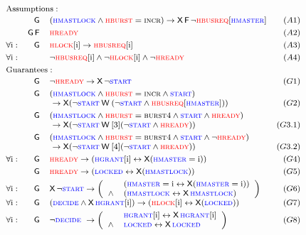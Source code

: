 \[
{\footnotesize
\begin{array}{rrlr}
\multicolumn{3}{l}{\mathrm{Assumptions:}} \\[2pt]
& \always & (\hmastlock \land \hburst = \hincr) \rightarrow \nextt \eventually \neg \hbusreqi[\hmaster] & (A1)\\[3pt]
& \always \eventually & \hready & (A2) \\[3pt]
\forall \mathrm i: & \always & \hlocki \rightarrow \hbusreqi & (A3) \\[3pt]
\forall \mathrm i: & & \neg \hbusreqi \land \neg \hlocki \land \neg \hready & (A4) \\[3pt]
\multicolumn{3}{l}{\mathrm{Guarantees:}} \\[2pt]
& \always & \neg \hready \rightarrow \nextt \neg \hstart & (G1) \\[3pt]
& \always & (\hmastlock \land \hburst = \hincr \land \hstart)\\
& & ~\rightarrow \nextt (\neg \hstart \weakuntil (\neg \hstart \land \hbusreqi[\hmaster])) & (G2) \\[3pt]
& \always & (\hmastlock \land \hburst = \hburstfour \land \hstart \land \hready)\\
& & ~\rightarrow \nextt (\neg \hstart \weakuntil[3] (\neg \hstart \land \hready)) & (G3.1) \\[3pt]
& \always & (\hmastlock \land \hburst = \hburstfour \land \hstart \land \neg \hready)\\
& & ~\rightarrow \nextt (\neg \hstart \weakuntil[4] (\neg \hstart \land \hready)) & (G3.2) \\[3pt]
\forall \mathrm i: & \always & \hready \rightarrow (\hgranti \leftrightarrow \nextt (\hmaster = {\mathrm i})) & (G4)\\[3pt]
& \always & \hready \rightarrow (\hlocked \leftrightarrow \nextt (\hmastlock)) & (G5)\\[3pt]
\forall \mathrm i: & \always & \nextt \neg \hstart \impl \left(
\begin{array}{ll}
 & (\hmaster = {\mathrm i} \leftrightarrow \nextt (\hmaster = {\mathrm i}))\\
\land & (\hmastlock \leftrightarrow \nextt \hmastlock)
\end{array}
 \right) & (G6)\\[3pt]
\forall \mathrm i: & \always & (\hdecide \land \nextt \hgranti) \rightarrow (\hlocki \leftrightarrow \nextt (\hlocked)) & (G7)\\[3pt]

\forall \mathrm i: & \always & \neg \hdecide\ \impl \left(
\begin{array}{ll}
       & \hgranti \leftrightarrow \nextt \hgranti \\
 \land & \hlocked \leftrightarrow \nextt \hlocked
\end{array}
\right) & (G8)\\[3pt]


\end{array}}\]

